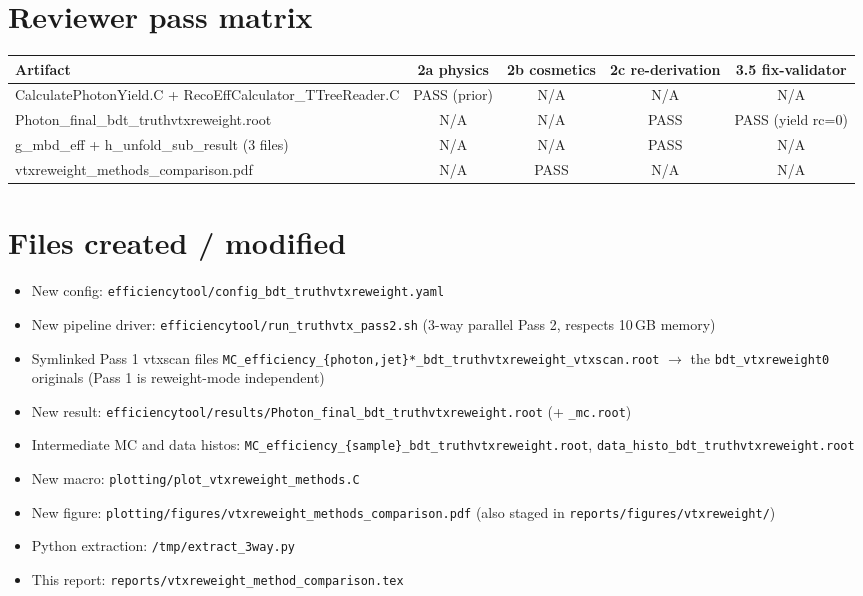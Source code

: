 \documentclass[11pt,a4paper]{article}
\begin{document}
\section*{Reviewer pass matrix}

\begin{center}\small
\begin{tabular}{lcccc}
\toprule
Artifact & 2a physics & 2b cosmetics & 2c re-derivation & 3.5 fix-validator \\
\midrule
CalculatePhotonYield.C + RecoEffCalculator\_TTreeReader.C & PASS (prior) & N/A & N/A  & N/A \\
Photon\_final\_bdt\_truthvtxreweight.root                 & N/A          & N/A & PASS & PASS (yield rc=0) \\
g\_mbd\_eff + h\_unfold\_sub\_result (3 files)            & N/A          & N/A & PASS & N/A \\
vtxreweight\_methods\_comparison.pdf                      & N/A          & PASS& N/A  & N/A \\
\bottomrule
\end{tabular}
\end{center}

\section*{Files created / modified}
\begin{itemize}
\item New config: \texttt{efficiencytool/config\_bdt\_truthvtxreweight.yaml}
\item New pipeline driver: \texttt{efficiencytool/run\_truthvtx\_pass2.sh} (3-way parallel Pass 2, respects 10\,GB memory)
\item Symlinked Pass 1 vtxscan files \texttt{MC\_efficiency\_\{photon,jet\}*\_bdt\_truthvtxreweight\_vtxscan.root} $\to$ the \texttt{bdt\_vtxreweight0} originals (Pass 1 is reweight-mode independent)
\item New result: \texttt{efficiencytool/results/Photon\_final\_bdt\_truthvtxreweight.root} (+ \texttt{\_mc.root})
\item Intermediate MC and data histos: \texttt{MC\_efficiency\_\{sample\}\_bdt\_truthvtxreweight.root}, \texttt{data\_histo\_bdt\_truthvtxreweight.root}
\item New macro: \texttt{plotting/plot\_vtxreweight\_methods.C}
\item New figure: \texttt{plotting/figures/vtxreweight\_methods\_comparison.pdf} (also staged in \texttt{reports/figures/vtxreweight/})
\item Python extraction: \texttt{/tmp/extract\_3way.py}
\item This report: \texttt{reports/vtxreweight\_method\_comparison.tex}
\end{itemize}
\end{document}
